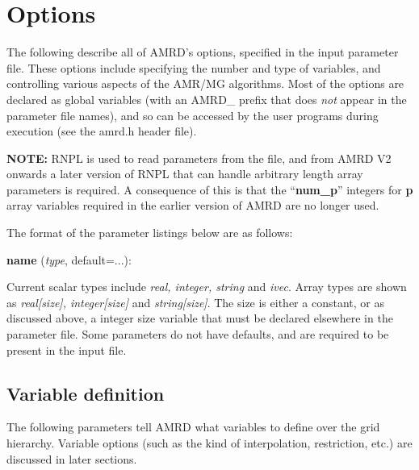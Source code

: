 \documentclass[aps,amssymb,unsortedaddress,nofootinbib]{revtex4}
\def\lsep{\itemsep 0.05in}
\begin{document}
\section{Options}\label{sec_opts}

The following describe all of AMRD's options, specified in the input
parameter file. These options include specifying the number and type
of variables, and controlling various aspects of the AMR/MG algorithms.
Most of the options are declared as global variables (with an AMRD\_
prefix that does {\em not} appear in the parameter file names), and
so can be accessed by the user programs during execution (see the 
amrd.h header file). 

{\bf NOTE:} RNPL is used to read parameters from the file, and from
AMRD V2 onwards a later version of RNPL that can handle
arbitrary length array parameters is required. A consequence of this
is that the ``{\bf num\_p}'' integers for {\bf p} array
variables required in the earlier version of AMRD are no longer used.

The format of the parameter listings below are as follows:

\begin{list}{}{\lsep}
\item {\bf name} ({\em type}, default=...):
\end{list}

Current scalar types include {\em real, integer, string} and {\em ivec}.
Array types are shown as {\em real[size], integer[size]} and {\em string[size]}.
The size is either a constant, or as discussed above, a integer size variable
that must be declared elsewhere in the parameter file.
Some parameters do not have defaults,
and are required to be present in the input file.

\subsection{Variable definition}

The following parameters tell AMRD what variables to define over the 
grid hierarchy. Variable options (such as the kind of interpolation, restriction, etc.)
are discussed in later sections.
\end{document}
